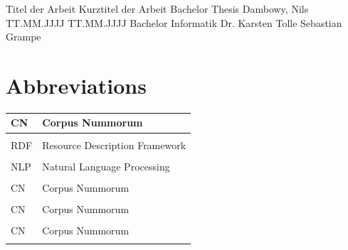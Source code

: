 \documentclass[12pt, oneside]{article}
\begin{document}
\DeclareRobustCommand{\hlcyan}[1]{{\sethlcolor{cyan}\hl{#1}}}
\DeclareRobustCommand{\hlgreen}[1]{{\sethlcolor{green}\hl{#1}}}
\DeclareRobustCommand{\hlred}[1]{{\sethlcolor{red}\hl{#1}}}



\titlespacing{\section}{0pt}{0pt}{0pt}
\titlespacing{\subsection}{0pt}{6pt}{0pt}
\titlespacing{\subsubsection}{0pt}{6pt}{0pt}

  \JMUTitle
      {Titel der Arbeit}                                %
      {Kurztitel der Arbeit}                            %
      {Bachelor Thesis}       %
      {Dambowy, Nils }                              %
      {TT.MM.JJJJ}                                      %
      {TT.MM.JJJJ}                                      %
      {Bachelor Informatik}           %
      {Dr. Karsten Tolle}                       
      {Sebastian Grampe}                                         %

\newpage
{}




\tableofcontents


\newpage
{}
\setcounter{page}{1}
  
  


\newpage
\section*{Abbreviations} \label{abv}
\begin{center}
\begin{tabular}{p{6cm}|p{6cm}}
CN & Corpus Nummorum\\
\hline\\
RDF & Resource Description Framework\\
\hline\\
NLP & Natural Language Processing\\
\hline\\
CN & Corpus Nummorum\\
\hline\\
CN & Corpus Nummorum\\
\hline\\
CN & Corpus Nummorum\\
\hline\\
\end{tabular}
\end{center}
\newpage
\end{document}
